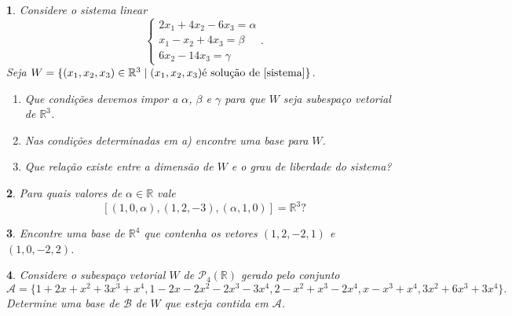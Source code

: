 \documentclass[12pt]{exam}
\newtheorem{exercicio}{}
\newcommand{\real}{\mathbb{R}}
\begin{document}
\begin{exercicio}
  Considere o sistema linear
  \begin{equation}\label{sistema}
    \begin{cases}
      2x_1 + 4x_2 - 6x_3 = \alpha\\
      x_1 - x_2 + 4x_3 = \beta\\
      6x_2 - 14x_3 = \gamma
    \end{cases}.
  \end{equation}
  Seja $W = \{(x_1, x_2, x_3) \in \real^3 \mid (x_1, x_2, x_3) \mbox{\'e solu\c{c}\~ao de } \eqref{sistema}\}$.
  \begin{enumerate}[label={\alph*})]
    \item Que condi\c{c}\~oes devemos impor a $\alpha$, $\beta$ e $\gamma$ para que $W$ seja subespa\c{c}o vetorial de $\real^3$.
    \item Nas condi\c{c}\~oes determinadas em \textit{a)} encontre uma base para $W$.
    \item Que rela\c{c}\~ao existe entre a dimens\~ao de $W$ e o grau de liberdade do sistema?
  \end{enumerate}
\end{exercicio}

\begin{exercicio}
  Para quais valores de $\alpha \in \real$ vale
  \[
    [(1, 0, \alpha), (1, 2, -3) , (\alpha, 1, 0)] = \real^3?
  \]
\end{exercicio}

\begin{exercicio}
  Encontre uma base de $\real^4$ que contenha os vetores $(1,2,-2,1)$ e $(1,0,-2,2)$.
\end{exercicio}

\begin{exercicio}
  Considere o subespa\c{c}o vetorial $W$ de $\mathcal{P}_4(\real)$ gerado pelo conjunto
  \[
    \mathcal{A} = \{1+2x+x^2+3x^3+x^4, 1-2x-2x^2-2x^3-3x^4,2-x^2+x^3-2x^4,x-x^3+x^4,3x^2+6x^3+3x^4\}.
  \]
  Determine uma base de $\mathcal{B}$ de $W$ que esteja contida em $\mathcal{A}$.
\end{exercicio}
\end{document}
